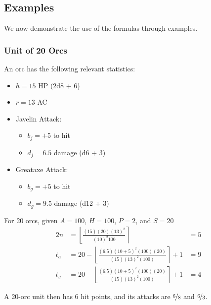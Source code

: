 \documentclass[twocolumn]{article}
\begin{document}
\subsection{Examples}\label{sec:examples}

We now demonstrate the use of the formulas through examples.

\subsubsection{Unit of 20 Orcs}

An orc has the following relevant statistics:
\begin{itemize}
    \item $h = 15$ HP (2d8 + 6)
    \item $r = 13$ AC
    \item Javelin Attack:
        \begin{itemize}
            \item $b_j = +5$ to hit
            \item $d_j = 6.5$ damage (d6 + 3)
        \end{itemize}
    \item Greataxe Attack:
        \begin{itemize}
            \item $b_g = +5$ to hit
            \item $d_g = 9.5$ damage (d12 + 3)
        \end{itemize}
\end{itemize}

For 20 orcs, given $A = 100$, $H = 100$, $P = 2$, and $S = 20$
\begin{alignat*}{2}
    n   &=  
        \left\lfloor
            \frac
                {(15) (20) (13)^2}
                {(10)^2 100}
        \right\rceil
            &=  5
    \\
    t_a &=
        20 -
        \left\lfloor
            \frac
                {(6.5) (10 + 5)^2 (100) (20)}
                {(15) (13)^2 (100)}
        \right\rceil
        + 1 
            &=   9
    \\
    t_g &=  
        20 -
        \left\lfloor
            \frac
                {(6.5) (10 + 5)^2 (100) (20)}
                {(15) (13)^2 (100)}
        \right\rceil
        + 1
            &=  4
\end{alignat*}

A 20-orc unit then has 6 hit points, and its attacks are
$\nicefrac{6}{8}$ and $\nicefrac{6}{3}$.
\end{document}
